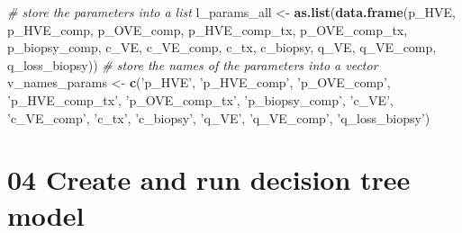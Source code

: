 \documentclass[
]{article}
\newenvironment{Shaded}{\begin{snugshade}}{\end{snugshade}}
\newcommand{\CommentTok}[1]{\textcolor[rgb]{0.56,0.35,0.01}{\textit{#1}}}
\newcommand{\KeywordTok}[1]{\textcolor[rgb]{0.13,0.29,0.53}{\textbf{#1}}}
\newcommand{\NormalTok}[1]{#1}
\newcommand{\StringTok}[1]{\textcolor[rgb]{0.31,0.60,0.02}{#1}}
\begin{document}
\begin{Shaded}
\begin{Highlighting}[]
\CommentTok{# store the parameters into a list}
\NormalTok{l_params_all <-}\StringTok{ }\KeywordTok{as.list}\NormalTok{(}\KeywordTok{data.frame}\NormalTok{(p_HVE, p_HVE_comp, p_OVE_comp, p_HVE_comp_tx, p_OVE_comp_tx, p_biopsy_comp, }
\NormalTok{                                   c_VE, c_VE_comp, c_tx, c_biopsy, }
\NormalTok{                                   q_VE, q_VE_comp, q_loss_biopsy))}
\CommentTok{# store the names of the parameters into a vector}
\NormalTok{v_names_params <-}\StringTok{ }\KeywordTok{c}\NormalTok{(}\StringTok{'p_HVE'}\NormalTok{, }\StringTok{'p_HVE_comp'}\NormalTok{, }\StringTok{'p_OVE_comp'}\NormalTok{, }\StringTok{'p_HVE_comp_tx'}\NormalTok{, }\StringTok{'p_OVE_comp_tx'}\NormalTok{, }\StringTok{'p_biopsy_comp'}\NormalTok{, }
                    \StringTok{'c_VE'}\NormalTok{, }\StringTok{'c_VE_comp'}\NormalTok{,  }\StringTok{'c_tx'}\NormalTok{, }\StringTok{'c_biopsy'}\NormalTok{, }\StringTok{'q_VE'}\NormalTok{, }\StringTok{'q_VE_comp'}\NormalTok{, }\StringTok{'q_loss_biopsy'}\NormalTok{)}
\end{Highlighting}
\end{Shaded}

\hypertarget{create-and-run-decision-tree-model}{%
\section{04 Create and run decision tree
model}\label{create-and-run-decision-tree-model}}
\end{document}
